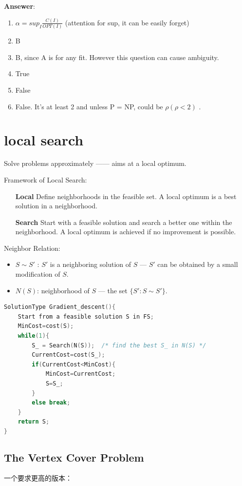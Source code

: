 \documentclass{article}
\begin{document}
\textbf{Ansewer}:
\begin{enumerate}
    \item $\alpha = sup_I\frac{C(I)}{OPT(I)}$ (attention for sup, it can be easily forget) 
    \item B
    \item B, since A is for any fit. However this question can cause ambiguity.
    \item True
    \item False
    \item False. It's at least 2 and unless P = NP, could be $\rho(\rho < 2)$ .
\end{enumerate}

\newpage
\section{local search}
Solve problems approximately —— aims at a local optimum. 

Framework of Local Search:
\begin{itemize}\small
    \item [\textbf{Local}]
    \subitem Define neighborhoods in the feasible set. 
    \subitem A local optimum is a best solution in a neighborhood. 
    \item [\textbf{Search}]
    \subitem Start with a feasible solution and search a better one within the neighborhood. 
    \subitem A local optimum is achieved if no improvement is possible. 
\end{itemize}

Neighbor Relation:
\begin{itemize}\small
    \item  $S \sim S'$ : $S'$ is a neighboring solution of $S$ --- $S'$ can be obtained by a small modification of $S$.
    \item  $N(S)$: neighborhood of $S$ --- the set $\{ S': S \sim S' \}$.
\end{itemize}
\begin{lstlisting}[language={c}]
SolutionType Gradient_descent(){
    Start from a feasible solution S in FS;
    MinCost=cost(S);
    while(1){
        S_ = Search(N(S));  /* find the best S_ in N(S) */
        CurrentCost=cost(S_);
        if(CurrentCost<MinCost){
            MinCost=CurrentCost;    
            S=S_;
        }
        else break;
    }
    return S;
}
\end{lstlisting}

\subsection{The Vertex Cover Problem}
一个要求更高的版本：\par
\end{document}
